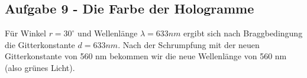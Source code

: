 \subsection*{Aufgabe 9 - Die Farbe der Hologramme}
Für Winkel $r = 30^{\circ}$ und Wellenlänge $\lambda = 633nm$ ergibt sich nach Braggbedingung die Gitterkonstante $d = 633 nm$. Nach der Schrumpfung mit der neuen Gitterkonstante von 560 nm bekommen wir die neue Wellenlänge von 560 nm (also grünes Licht).